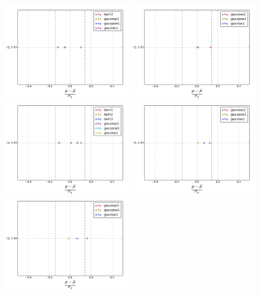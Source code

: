 \begin{figure}[htbp]
  \begin{center}
		\includegraphics[width=0.42\textwidth]{figures/chapter04/Bias/M7.png}
        \includegraphics[width=0.42\textwidth]{figures/chapter04/Bias/M8.png} \\
		\includegraphics[width=0.42\textwidth]{figures/chapter04/Bias/M9.png}
		\includegraphics[width=0.42\textwidth]{figures/chapter04/Bias/M10.png}\\
		\includegraphics[width=0.42\textwidth]{figures/chapter04/Bias/M15.png}

\end{center}
\end{figure}
